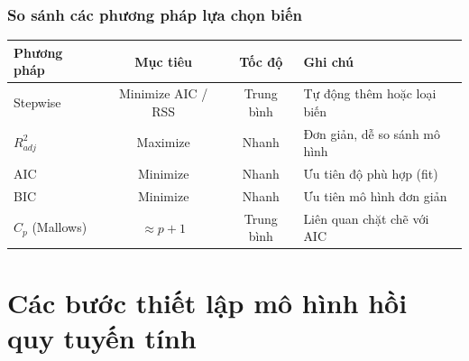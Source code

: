 \begin{frame}
    \frametitle{So sánh các phương pháp lựa chọn biến}
    
    \begin{table}
    \centering
    \scriptsize
    \begin{tabular}{|l|c|c|l|}
    \hline
    \textbf{Phương pháp} & \textbf{Mục tiêu} & \textbf{Tốc độ} & \textbf{Ghi chú} \\
    \hline
    Stepwise & Minimize AIC / RSS & Trung bình & Tự động thêm hoặc loại biến \\
    \hline
    $R^2_{adj}$ & Maximize & Nhanh & Đơn giản, dễ so sánh mô hình \\
    \hline
    AIC & Minimize & Nhanh & Ưu tiên độ phù hợp (fit) \\
    \hline
    BIC & Minimize & Nhanh & Ưu tiên mô hình đơn giản \\
    \hline
    $C_p$ (Mallows) & $\approx p+1$ & Trung bình & Liên quan chặt chẽ với AIC \\
    \hline
    \end{tabular}
    \end{table}
\end{frame}


\section{Các bước thiết lập mô hình hồi quy tuyến tính}

